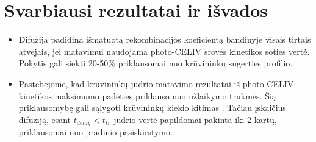 \section{Svarbiausi rezultatai ir išvados}
\begin{itemize}
\item Difuzija padidina išmatuotą rekombinacijos koeficientą bandinyje visais tirtais atvejais, jei matavimui naudojama photo-CELIV srovės kinetikos soties vertė. Pokytis gali siekti 20-50\% priklausomai nuo krūvininkų sugerties profilio.

\item Pastebėjome, kad krūvininkų judrio matavimo rezultatai iš photo-CELIV kinetikos maksimumo padėties priklauso nuo užlaikymo trukmės. Šią priklausomybę gali sąlygoti krūvininkų kiekio kitimas \cite{juška:155202}. Tačiau įskaičius difuziją, esant $t_{delay} < t_{tr}$ judrio vertė papildomai pakinta iki 2 kartų, priklausomai nuo pradinio pasiskirstymo.

\end{itemize} 
